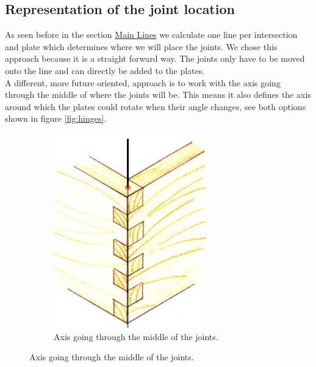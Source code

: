 \documentclass[../ClassicThesis.tex]{subfiles}
\begin{document}
\subsection{Representation of the joint location}
As seen before in the section \hyperref[mainLine]{Main Lines} we calculate one line per intersection and plate which determines where we will place the joints. We chose this approach because it is a straight forward way. The joints only have to be moved onto the line and can directly be added to the plates. \\
A different, more future oriented, approach is to work with the axis going through the middle of where the joints will be. This means it also defines the axis around which the plates could rotate when their angle changes, see both options shown in figure \ref{fig:hinges}. 
\begin{figure}
    \centering
    \begin{subfigure}[b]{0.45\textwidth}
\includegraphics[width=\columnwidth]{Images/woodenFingers.jpg}
\caption{Axis going through the middle of the joints.}

\end{subfigure}
\end{figure}
\end{document}
